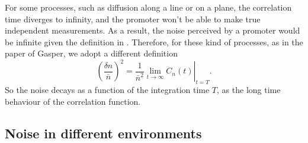 For some processes, such as diffusion along a line or on a plane, the correlation time diverges to infinity, and the promoter won't be able to make true independent measurements. As a result, the noise perceived by a promoter would be infinite given the definition in . Therefore, for these kind of processes, as in the paper of Gasper, we adopt a different definition
\begin{equation}
  \left( \frac{\delta n}{\bar{n}} \right)^2 = \left. \frac{1}{\bar{n}^2} \lim_{t \rightarrow \infty} C_n(t)  \right|_{t = T}.
\end{equation}
So the noise decays as a function of the integration time $T$, as the long time behaviour of the correlation function.


\subsection{Noise in different environments}

